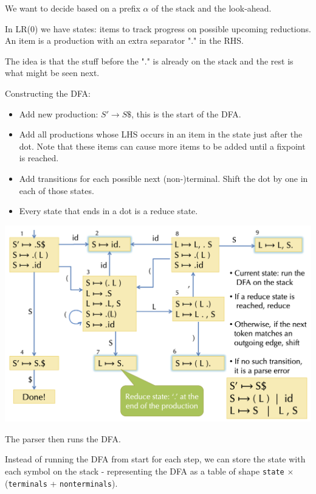 We want to decide based on a prefix $\alpha$ of the stack and the look-ahead. \medskip
		
In LR(0) we have states: items to track progress on possible upcoming reductions. An item is a production with an extra separator "." in the RHS. \medskip
		
The idea is that the stuff before the "." is already on the stack and the rest is what might be seen next. \medskip
		
Constructing the DFA:
\begin{itemize}
	\item Add new production: $S' \to S\$$, this is the start of the DFA.
						
	\item Add all productions whose LHS occurs in an item in the state just after the dot. Note that these items can cause more items to be added until a fixpoint is reached.
			
	\item Add transitions for each possible next (non-)terminal. Shift the dot by one in each of those states.
	
	\item Every state that ends in a dot is a reduce state.
\end{itemize} 

\begin{center}
	\includegraphics[width=0.9\linewidth]{assets/dfa.png}
\end{center}

The parser then runs the DFA.\medskip

Instead of running the DFA from start for each step, we can store the state with each symbol on the stack - representing the DFA as a table of shape \texttt{state} $\times$ (\texttt{terminals} + \texttt{nonterminals}). \medskip

